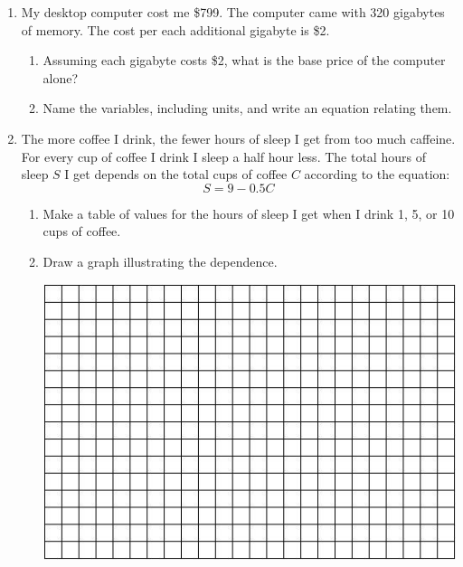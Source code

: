 \documentclass[12pt]{article}
\begin{document}
\begin{enumerate}

\item My desktop computer cost me \$799.  The computer came with 320 gigabytes of memory.  The cost per each additional gigabyte is \$2.  

\begin{enumerate}
\item Assuming each gigabyte costs \$2, what is the base price of the computer alone?
\vfill

\item Name the variables, including units, and write an equation relating them.
\vfill
\vfill
\end{enumerate}

\newpage %


\item The more coffee I drink, the fewer hours of sleep I get from too much caffeine.  For every cup of coffee I drink I sleep a half hour less.  The total hours of sleep $S$ I get depends on the total cups of coffee $C$ according to the equation: $$S=9-0.5C$$

\begin{enumerate}
\item Make a table of values for the hours of sleep I get when I drink 1, 5, or 10 cups of coffee. 
\vfill
\vfill
\item Draw a graph illustrating the dependence.  

\vspace{.1in}
\begin{center}
 {\includegraphics [width = 6in] {../GraphPaper}}
\end{center}
\vspace{.1in}


\end{enumerate}
\end{enumerate}
\end{document}
